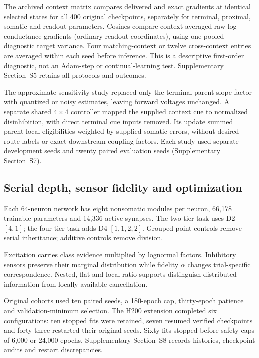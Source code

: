 \documentclass[11pt]{article}
\begin{document}
The archived context matrix compares delivered and exact gradients at identical selected states for all 400 original checkpoints, separately for terminal, proximal, somatic and readout parameters. Cosines compare context-averaged raw log-conductance gradients (ordinary readout coordinates), using one pooled diagnostic target variance. Four matching-context or twelve cross-context entries are averaged within each seed before inference. This is a descriptive first-order diagnostic, not an Adam-step or continual-learning test. Supplementary Section~S5 retains all protocols and outcomes.



The approximate-sensitivity study replaced only the terminal parent-slope factor with quantized or noisy estimates, leaving forward voltages unchanged. A separate shared $4\times4$ controller mapped the supplied context cue to normalized disinhibition, with direct terminal cue inputs removed. Its update summed parent-local eligibilities weighted by supplied somatic errors, without desired-route labels or exact downstream coupling factors. Each study used separate development seeds and twenty paired evaluation seeds (Supplementary Section~S7).

\subsection*{Serial depth, sensor fidelity and optimization}

Each 64-neuron network has eight nonsomatic modules per neuron, 66,178 trainable parameters and 14,336 active synapses. The two-tier task uses D2 $[4,1]$; the four-tier task adds D4 $[1,1,2,2]$. Grouped-point controls remove serial inheritance; additive controls remove division.

Excitation carries class evidence multiplied by lognormal factors. Inhibitory sensors preserve their marginal distribution while fidelity $\alpha$ changes trial-specific correspondence. Nested, flat and local-ratio supports distinguish distributed information from locally available cancellation.

Original cohorts used ten paired seeds, a 180-epoch cap, thirty-epoch patience and validation-minimum selection. The H200 extension completed six configurations: ten stopped fits were retained, seven resumed verified checkpoints and forty-three restarted their original seeds. Sixty fits stopped before safety caps of 6,000 or 24,000 epochs. Supplementary Section~S8 records histories, checkpoint audits and restart discrepancies.
\end{document}
